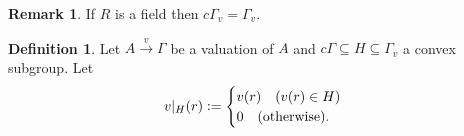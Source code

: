 \documentclass[10pt]{article}
\numberwithin{equation}{section}
\theoremstyle{definition}
\newtheorem{definition}{Definition}[subsection]
\newtheorem{remark}{Remark}[subsection]
\newcommand{\defeq}{\vcentcolon=}
\newcommand{\cGamma}[0]{c\Gamma}
\begin{document}
\begin{remark}
    If $R$ is a field then $\cGamma_v=\Gamma_v$.
\end{remark}

\begin{definition}
    \label{definition_7_10}
    Let $A\stackrel{v}{\to}\Gamma$ be a valuation of $A$ and $\cGamma\subseteq H\subseteq\Gamma_v$ a convex subgroup. Let
    \begin{equation*}
        v|_{H}(r)\defeq\begin{cases}
            v(r)\quad(v(r)\in H)\\
            0\quad(\text{otherwise}).
        \end{cases}
    \end{equation*}
\end{definition}
\end{document}
